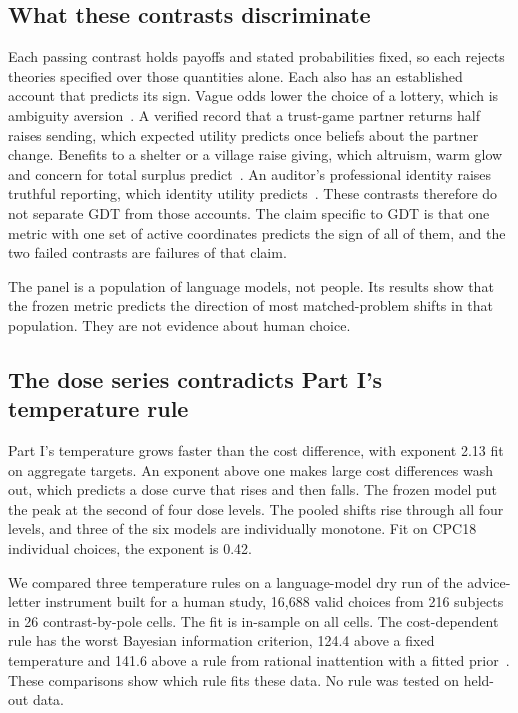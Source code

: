 \documentclass[journal]{IEEEtran}
\begin{document}
\subsection{What these contrasts discriminate}
Each passing contrast holds payoffs and stated probabilities fixed, so each rejects theories specified over those quantities alone.
Each also has an established account that predicts its sign.
Vague odds lower the choice of a lottery, which is ambiguity aversion~\cite{ellsberg1961}.
A verified record that a trust-game partner returns half raises sending, which expected utility predicts once beliefs about the partner change.
Benefits to a shelter or a village raise giving, which altruism, warm glow and concern for total surplus predict~\cite{andreoni1990,charness2002}.
An auditor's professional identity raises truthful reporting, which identity utility predicts~\cite{akerlof2000}.
These contrasts therefore do not separate GDT from those accounts.
The claim specific to GDT is that one metric with one set of active coordinates predicts the sign of all of them, and the two failed contrasts are failures of that claim.

The panel is a population of language models, not people.
Its results show that the frozen metric predicts the direction of most matched-problem shifts in that population.
They are not evidence about human choice.

\subsection{The dose series contradicts Part I's temperature rule}
Part I's temperature grows faster than the cost difference, with exponent 2.13 fit on aggregate targets.
An exponent above one makes large cost differences wash out, which predicts a dose curve that rises and then falls.
The frozen model put the peak at the second of four dose levels.
The pooled shifts rise through all four levels, and three of the six models are individually monotone.
Fit on CPC18 individual choices, the exponent is 0.42.

We compared three temperature rules on a language-model dry run of the advice-letter instrument built for a human study, 16{,}688 valid choices from 216 subjects in 26 contrast-by-pole cells.
The fit is in-sample on all cells.
The cost-dependent rule has the worst Bayesian information criterion, 124.4 above a fixed temperature and 141.6 above a rule from rational inattention with a fitted prior~\cite{sims2003,matejka2015}.
These comparisons show which rule fits these data.
No rule was tested on held-out data.
\end{document}
